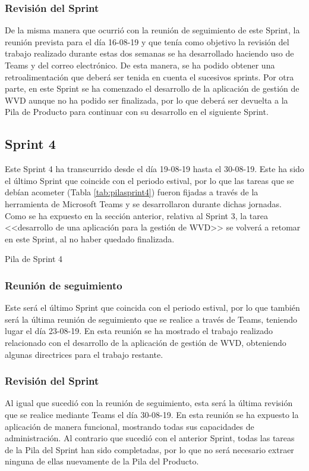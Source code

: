 \subsubsection{Revisión del Sprint}
De la misma manera que ocurrió con la reunión de seguimiento de este Sprint, la reunión prevista para el día 16-08-19 y que tenía como objetivo la revisión del trabajo realizado durante estas dos semanas se ha desarrollado haciendo uso de Teams y del correo electrónico. De esta manera, se ha podido obtener una retroalimentación que deberá ser tenida en cuenta el sucesivos sprints. Por otra parte, en este Sprint se ha comenzado el desarrollo de la aplicación de gestión de \acs{WVD} aunque no ha podido ser finalizada, por lo que deberá ser devuelta a la Pila de Producto para continuar con su desarrollo en el siguiente Sprint.

\clearpage

\subsection{Sprint 4}
Este Sprint 4 ha transcurrido desde el día 19-08-19 hasta el 30-08-19. Este ha sido el último Sprint que coincide con el periodo estival, por lo que las tareas que se debían acometer (Tabla \ref{tab:pilasprint4}) fueron fijadas a través de la herramienta de Microsoft Teams y se desarrollaron durante dichas jornadas. Como se ha expuesto en la sección anterior, relativa al Sprint 3, la tarea <<desarrollo de una aplicación para la gestión de \acs{WVD}>> se volverá a retomar en este Sprint, al no haber quedado finalizada.

\begin{table}[!htbp]
	\centering
	{\small
		
	}
	\caption[Pila de Sprint 4]
	{Pila de Sprint 4}
	\label{tab:pilasprint4}
\end{table}

\subsubsection{Reunión de seguimiento}
Este será el último Sprint que coincida con el periodo estival, por lo que también será la última reunión de seguimiento que se realice a través de Teams, teniendo lugar el día 23-08-19. En esta reunión se ha mostrado el trabajo realizado relacionado con el desarrollo de la aplicación de gestión de \acs{WVD}, obteniendo algunas directrices para el trabajo restante.

\subsubsection{Revisión del Sprint}
Al igual que sucedió con la reunión de seguimiento, esta será la última revisión que se realice mediante Teams el día 30-08-19. En esta reunión se ha expuesto la aplicación de manera funcional, mostrando todas sus capacidades de administración. Al contrario que sucedió con el anterior Sprint, todas las tareas de la Pila del Sprint han sido completadas, por lo que no será necesario extraer ninguna de ellas nuevamente de la Pila del Producto.

